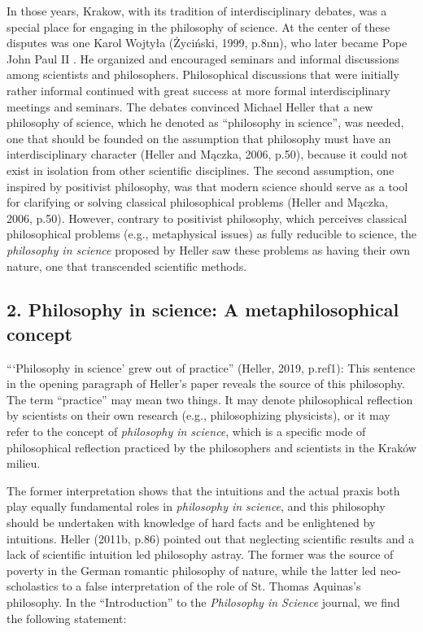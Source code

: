 \documentclass[a4paper]{article}
\begin{document}
In those years, Krakow, with its tradition of interdisciplinary debates, was a special place for engaging in the
philosophy of science. At the center of these disputes was one Karol Wojtyła (Życiński, 1999, p.8nn), who later became
Pope John Paul II . He organized and encouraged seminars and informal discussions among scientists and philosophers.
Philosophical discussions that were initially rather informal continued with great success at more formal
interdisciplinary meetings and seminars. The debates convinced Michael Heller that a new philosophy of science, which
he denoted as “philosophy in science”, was needed, one that should be founded on the assumption that philosophy must
have an interdisciplinary character (Heller and Mączka, 2006, p.50), because it could not exist in isolation from other
scientific disciplines. The second assumption, one inspired by positivist philosophy, was that modern science should
serve as a tool for clarifying or solving classical philosophical problems (Heller and Mączka, 2006, p.50). However,
contrary to positivist philosophy, which perceives classical philosophical problems (e.g., metaphysical issues) as
fully reducible to science, the \textit{philosophy in science }proposed by Heller saw these problems as having their
own nature, one that transcended scientific methods.

\subsection{2. Philosophy in science: A metaphilosophical concept}
“‘Philosophy in science’ grew out of practice” (Heller, 2019, p.ref1): This sentence in the opening paragraph of
Heller’s paper reveals the source of this philosophy. The term “practice” may mean two things. It may denote
philosophical reflection by scientists on their own research (e.g., philosophizing physicists), or it may refer to the
concept of \textit{philosophy in science}, which is a specific mode of philosophical reflection practiced by the
philosophers and scientists in the Kraków milieu. 

The former interpretation shows that the intuitions and the actual praxis both play equally fundamental roles in
\textit{philosophy in science}, and this philosophy should be undertaken with knowledge of hard facts and be
enlightened by intuitions. Heller (2011b, p.86) pointed out that neglecting scientific results and a lack of scientific
intuition led philosophy astray. The former was the source of poverty in the German romantic philosophy of nature,
while the latter led neo-scholastics to a false interpretation of the role of St. Thomas Aquinas’s philosophy. In the
“Introduction” to the \textit{Philosophy in Science }journal, we find the following statement:
\end{document}
